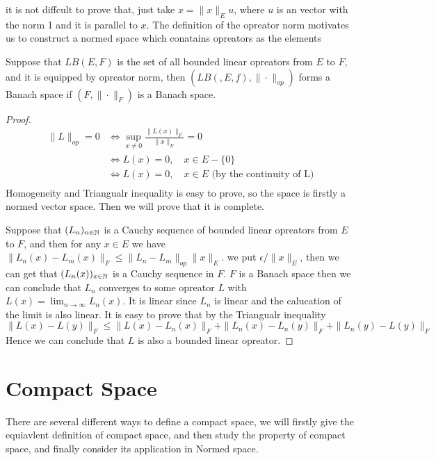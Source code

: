 \documentclass[en,hazy,black,noraml,12pt]{elegantnote}
\begin{document}
it is not diffcult to prove that, just take \(x=\|x\|_Eu\), where \(u\) is an vector with the norm 1 and it is parallel to \(x\). The definition of the opreator norm motivates us to construct a normed space which conatains opreators as the elements

    \begin{theorem}
        Suppose that \(LB(E,F)\) is the set of all bounded linear opreators from \(E\) to \(F\), and it is equipped by opreator norm, then \((LB(,E,f),\|\cdot\|_{op})\) forms a Banach space if \((F,\|\cdot\|_F)\) is a Banach space.

        \begin{proof}
            \begin{align*}
                \|L\|_{op} = 0 &\iff \sup_{x \neq 0} \frac{\|L(x)\|_F}{\|x\|_E} =0 \\
                &\iff L(x)=0 ,\quad x\in E-\{0\} \\
                &\iff L(x)=0 ,\quad x\in E \text{ (by the continuity of L)} \\
            \end{align*}
            Homogeneity and Triangualr inequality is easy to prove, so the space is firstly a normed vector space. Then we will prove that it is complete.

            Suppose that \((L_n)_{n \in \mathbb{N}}\) is a Cauchy sequence of bounded linear opreators from \(E\) to \(F\), and then for any \(x \in E \) we have \(\|L_n(x)-L_m(x)\|_F \leq \|L_n-L_m\|_{op}\|x\|_E\). we put \(\epsilon /\|x\|_E\), then we can get that \((L_n(x))_{x \in \mathbb{N}}\) is a Cauchy sequence in \(F\). \(F\) is a Banach space then we can conclude that \(L_n\) converges to some opreator \(L\) with \(L(x) = \lim_{n \rightarrow \infty}L_n(x)\). It is linear since \(L_n\) is linear and the calucation of the limit is also linear. It is easy to prove that by the Triangualr inequality
            \[\|L(x)-L(y)\|_F \leq \|L(x)-L_n(x)\|_F+\|L_n(x)-L_n(y)\|_F+\|L_n(y)-L(y)\|_F\]
            Hence we can conclude that \(L\) is also a bounded linear opreator.
        \end{proof}
    \end{theorem}

\section{Compact Space}

There are several different ways to define a compact space, we will firstly give the equiavlent definition of compact space, and then study the property of compact space, and finally consider its application in Normed space.
\end{document}
